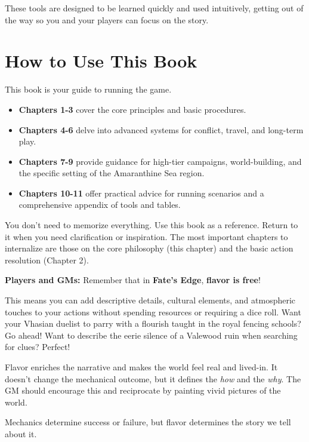 These tools are designed to be learned quickly and used intuitively, getting out of the way so you and your players can focus on the story.

\section*{How to Use This Book}

This book is your guide to running the game.
\begin{itemize}
    \item \textbf{Chapters 1-3} cover the core principles and basic procedures.
    \item \textbf{Chapters 4-6} delve into advanced systems for conflict, travel, and long-term play.
    \item \textbf{Chapters 7-9} provide guidance for high-tier campaigns, world-building, and the specific setting of the Amaranthine Sea region.
    \item \textbf{Chapters 10-11} offer practical advice for running scenarios and a comprehensive appendix of tools and tables.
\end{itemize}

You don't need to memorize everything. Use this book as a reference. Return to it when you need clarification or inspiration. The most important chapters to internalize are those on the core philosophy (this chapter) and the basic action resolution (Chapter 2).

\begin{tcolorbox}[enhanced, sharp corners, boxrule=1pt, colback=gray!5!white, colframe=gray!75!black, title={Flavor is Free}]
\textbf{Players and GMs:} Remember that in \textbf{Fate's Edge}, \textbf{flavor is free}!

This means you can add descriptive details, cultural elements, and atmospheric touches to your actions without spending resources or requiring a dice roll. Want your Vhasian duelist to parry with a flourish taught in the royal fencing schools? Go ahead! Want to describe the eerie silence of a Valewood ruin when searching for clues? Perfect!

Flavor enriches the narrative and makes the world feel real and lived-in. It doesn't change the mechanical outcome, but it defines the \emph{how} and the \emph{why}. The GM should encourage this and reciprocate by painting vivid pictures of the world.

Mechanics determine success or failure, but flavor determines the story we tell about it.
\end{tcolorbox}

